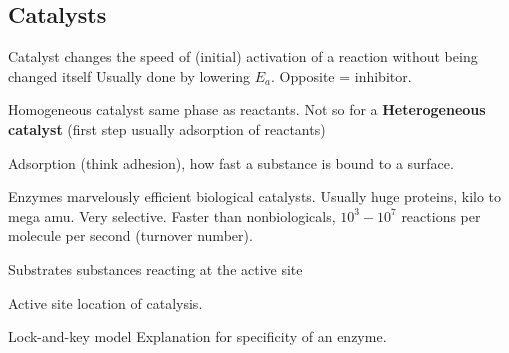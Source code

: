 \begin{mdframed}\subsection{Catalysts}
\begin{multicols}{2}
\begin{compactdesc}
    \item[Catalyst] changes the speed of (initial) activation of a reaction without being changed itself
        Usually done by lowering $E_a$. Opposite = inhibitor.
    \item[Homogeneous catalyst] same phase as reactants. Not so for a
        \textbf{Heterogeneous catalyst} (first step usually adsorption of
        reactants)
    \item[Adsorption] (think adhesion), how fast a substance is bound to a
        surface.
    \item[Enzymes] marvelously efficient biological catalysts. Usually huge
        proteins, kilo to mega amu. Very selective. Faster than nonbiologicals,
        $10^3 - 10^7$ reactions per molecule per second (turnover number).
    \item[Substrates] substances reacting at the active site
    \item[Active site] location of catalysis.
    \item[Lock-and-key model] Explanation for specificity of an enzyme.
\end{compactdesc}
\end{multicols}
\end{mdframed}
